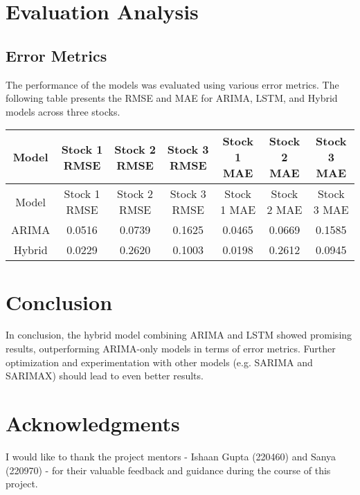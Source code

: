 \documentclass{article} %
\begin{document}
\section{Evaluation Analysis}

\subsection{Error Metrics}
The performance of the models was evaluated using various error metrics. The following table presents the RMSE and MAE for ARIMA, LSTM, and Hybrid models across three stocks.

\begin{longtable}{|c|c|c|c|c|c|c|}
\hline
Model & Stock 1 RMSE & Stock 2 RMSE & Stock 3 RMSE & Stock 1 MAE & Stock 2 MAE & Stock 3 MAE \\
\hline
\endfirsthead
\hline
Model & Stock 1 RMSE & Stock 2 RMSE & Stock 3 RMSE & Stock 1 MAE & Stock 2 MAE & Stock 3 MAE \\
\hline
\endhead
\hline
ARIMA & 0.0516 & 0.0739 & 0.1625 & 0.0465 & 0.0669 &  0.1585\\
Hybrid & 0.0229 & 0.2620 & 0.1003 & 0.0198 & 0.2612 & 0.0945 \\
\hline
\end{longtable}

\section{Conclusion}
In conclusion, the hybrid model combining ARIMA and LSTM showed promising results, outperforming ARIMA-only models in terms of error metrics. Further optimization and experimentation with other models (e.g. SARIMA and SARIMAX) should lead to even better results.

\section{Acknowledgments}
I would like to thank the project mentors - Ishaan Gupta (220460) and Sanya (220970) - for their valuable feedback and guidance during the course of this project.

% 
% 
\end{document}
